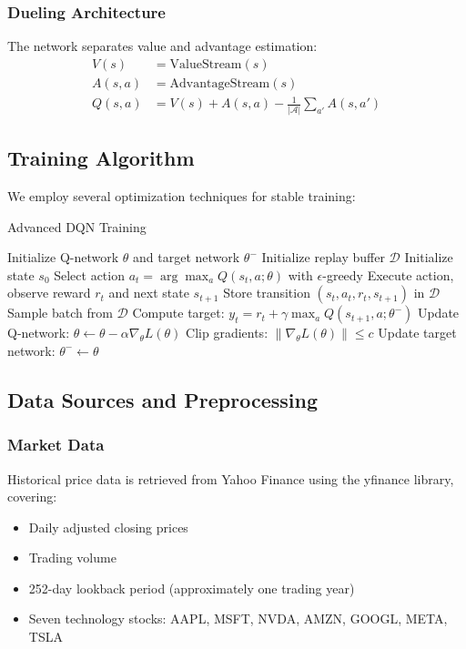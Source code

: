 \documentclass[12pt,a4paper]{article}
\begin{document}
\subsubsection{Dueling Architecture}
The network separates value and advantage estimation:
\begin{align}
V(s) &= \text{ValueStream}(s) \\
A(s,a) &= \text{AdvantageStream}(s) \\
Q(s,a) &= V(s) + A(s,a) - \frac{1}{|\mathcal{A}|}\sum_{a'} A(s,a')
\end{align}

\subsection{Training Algorithm}

We employ several optimization techniques for stable training:

\begin{algorithm}
\caption{Advanced DQN Training}
\begin{algorithmic}[1]
\STATE Initialize Q-network $\theta$ and target network $\theta^-$
\STATE Initialize replay buffer $\mathcal{D}$
    \STATE Initialize state $s_0$
        \STATE Select action $a_t = \arg\max_a Q(s_t, a; \theta)$ with $\epsilon$-greedy
        \STATE Execute action, observe reward $r_t$ and next state $s_{t+1}$
        \STATE Store transition $(s_t, a_t, r_t, s_{t+1})$ in $\mathcal{D}$
            \STATE Sample batch from $\mathcal{D}$
            \STATE Compute target: $y_t = r_t + \gamma \max_a Q(s_{t+1}, a; \theta^-)$
            \STATE Update Q-network: $\theta \leftarrow \theta - \alpha \nabla_\theta L(\theta)$
            \STATE Clip gradients: $\|\nabla_\theta L(\theta)\| \leq c$
        \ENDIF
            \STATE Update target network: $\theta^- \leftarrow \theta$
        \ENDIF
    \ENDFOR
\ENDFOR
\end{algorithmic}
\end{algorithm}

\subsection{Data Sources and Preprocessing}

\subsubsection{Market Data}
Historical price data is retrieved from Yahoo Finance using the yfinance library, covering:
\begin{itemize}
\item Daily adjusted closing prices
\item Trading volume
\item 252-day lookback period (approximately one trading year)
\item Seven technology stocks: AAPL, MSFT, NVDA, AMZN, GOOGL, META, TSLA
\end{itemize}
\end{document}
